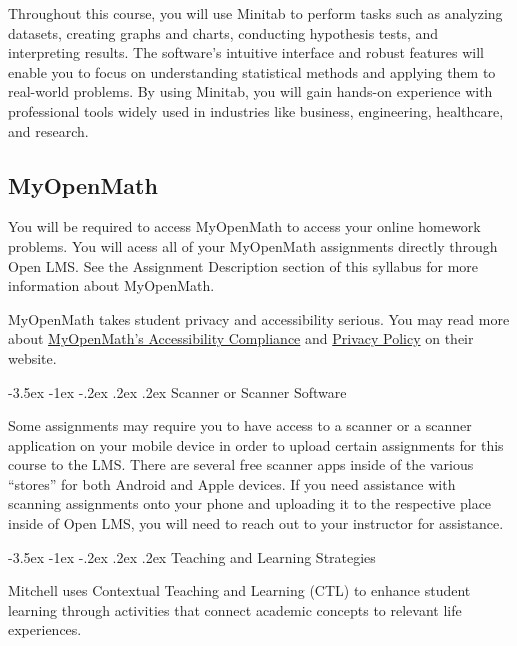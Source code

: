 \documentclass{article}
\makeatletter
\renewcommand\section{\@startsection{section}{1}{0pt}%
  {-3.5ex \@plus -1ex \@minus -.2ex}%
  {.2ex \@plus.2ex}%
  {\normalfont\Large\bfseries}} %
\makeatother
\begin{document}
Throughout this course, you will use Minitab to perform tasks such as analyzing datasets, creating graphs and charts, conducting hypothesis tests, and interpreting results. The software's intuitive interface and robust features will enable you to focus on understanding statistical methods and applying them to real-world problems. By using Minitab, you will gain hands-on experience with professional tools widely used in industries like business, engineering, healthcare, and research.

\subsection{MyOpenMath}

You will be required to access MyOpenMath to access your online homework problems. You will acess all of your MyOpenMath assignments directly through Open LMS. See the Assignment Description section of this syllabus for more information about MyOpenMath.

MyOpenMath takes student privacy and accessibility serious. You may read more about \href{https://asccc.org/sites/default/files/MyOpenMath\%20\_\%20WAMAP\%20\_\%20IMathAS\%20Accessibility.pdf}{MyOpenMath's Accessibility Compliance} and \href{https://www.myopenmath.com/info/policies/privacy.php}{Privacy Policy} on their website.

\section{Scanner or Scanner Software}

Some assignments may require you to have access to a scanner or a scanner application on your mobile device in order to upload certain assignments for this course to the LMS. There are several free scanner apps inside of the various ``stores'' for both Android and Apple devices. If you need assistance with scanning assignments onto your phone and uploading it to the respective place inside of Open LMS, you will need to reach out to your instructor for assistance.

\section{Teaching and Learning Strategies}

Mitchell uses Contextual Teaching and Learning (CTL) to enhance student learning through activities that connect academic concepts to relevant life experiences.
\end{document}
